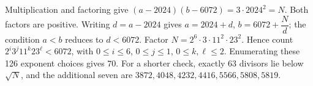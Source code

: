 Multiplication and factoring give $(a-2024)(b-6072)=3\cdot2024^2=N$. Both factors are positive. Writing $d=a-2024$ gives $a=2024+d$, $b=6072+\dfrac{N}{d}$; the condition $a<b$ reduces to $d<6072$. Factor $N=2^6\cdot3\cdot11^2\cdot23^2$. Hence count $2^i3^j11^k23^\ell<6072$, with $0\le i\le6$, $0\le j\le1$, $0\le k,\ell\le2$. Enumerating these 126 exponent choices gives $\boxed{70}$. For a shorter check, exactly 63 divisors lie below $\sqrt N$, and the additional seven are $3872,4048,4232,4416,5566,5808,5819$.
